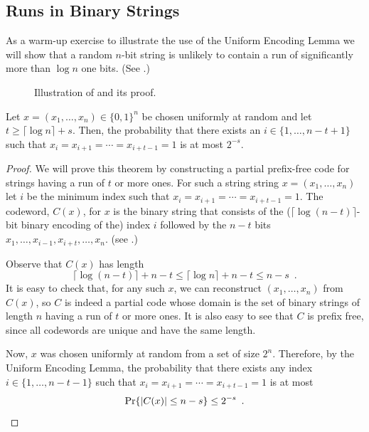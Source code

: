 \documentclass{patmorin}
\begin{document}
\subsection{Runs in Binary Strings}

As a warm-up exercise to illustrate the use of the Uniform Encoding
Lemma we will show that a random $n$-bit string is unlikely to contain
a run of significantly more than $\log n$ one bits.  (See .)

\begin{figure}
  \caption{Illustration of  and its proof.}
\end{figure}

\begin{thm}
  Let $x=(x_1,\ldots,x_n)\in\{0,1\}^n$ be chosen uniformly at random
  and let $t \ge \lceil\log n\rceil + s$. Then, the probability that
  there exists an $i\in\{1,\ldots,n-t+1\}$ such that
  $x_i=x_{i+1}=\cdots=x_{i+t-1}=1$ is at most $2^{-s}$.
\end{thm}

\begin{proof}
  We will prove this theorem by constructing a partial prefix-free
  code for strings having a run of $t$ or more ones.  For such a string
  string $x=(x_1,\ldots,x_n)$ let $i$ be the minimum index such that
  $x_i=x_{i+1}=\cdots=x_{i+t-1}=1$. The codeword, $C(x)$, for $x$ is
  the binary string that consists of the
  ($\lceil\log (n - t)\rceil$-bit binary encoding of the) index $i$
  followed by the $n-t$ bits
  $x_1,\ldots,x_{i-1},x_{i+t},\ldots,x_n$. (see .)

  Observe that $C(x)$ has length 
  \[
  \lceil\log (n - t)\rceil + n - t \le \lceil\log n\rceil + n - t \le
  n-s \enspace .
  \]
  It is easy to check that, for any such $x$, we can reconstruct
  $(x_1,\ldots,x_n)$ from $C(x)$, so $C$ is indeed a partial code
  whose domain is the set of binary strings of length $n$ having a run
  of $t$ or more ones.  It is also easy to see that $C$ is prefix free,
  since all codewords are unique and have the same length.

  Now, $x$ was chosen uniformly at random from a set of size $2^{n}$.
  Therefore, by the Uniform Encoding Lemma, the probability that there
  exists any index $i\in\{1,\ldots,n-t-1\}$ such that
  $x_i=x_{i+1}=\cdots=x_{i+t-1}=1$ is at most
  \[
      \Pr\{|C(x)|\le n-s\} \le 2^{-s} \enspace . \qedhere 
  \]
\end{proof}
\end{document}
